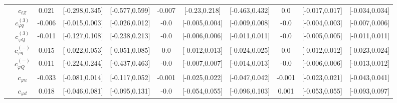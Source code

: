\documentclass{article}
\begin{document}
\begin{table}[H]
\begin{tabular}{|c|c|c|c|c|c|c|c|c|c|c|}
 & $c_{tZ}$ & 0.021                             & [-0.298,0.345]                                 & [-0.577,0.599] & -0.007                             & [-0.23,0.218]                                 & [-0.463,0.432] & 0.0                             & [-0.017,0.017]                                 & [-0.034,0.034] \\ \cline{2-11}
 & $c_{\varphi q}^{(3)}$ & -0.006                             & [-0.015,0.003]                                 & [-0.026,0.012] & -0.0                             & [-0.005,0.004]                                 & [-0.009,0.008] & -0.0                             & [-0.004,0.003]                                 & [-0.007,0.006] \\ \cline{2-11}
 & $c_{\varphi Q}^{(3)}$ & -0.011                             & [-0.127,0.108]                                 & [-0.238,0.213] & -0.0                             & [-0.006,0.006]                                 & [-0.011,0.011] & -0.0                             & [-0.005,0.005]                                 & [-0.011,0.011] \\ \cline{2-11}
 & $c_{\varphi q}^{(-)}$ & 0.015                             & [-0.022,0.053]                                 & [-0.051,0.085] & 0.0                             & [-0.012,0.013]                                 & [-0.024,0.025] & 0.0                             & [-0.012,0.012]                                 & [-0.023,0.024] \\ \cline{2-11}
 & $c_{\varphi Q}^{(-)}$ & 0.011                             & [-0.224,0.244]                                 & [-0.437,0.463] & -0.0                             & [-0.007,0.007]                                 & [-0.014,0.013] & -0.0                             & [-0.006,0.006]                                 & [-0.013,0.012] \\ \cline{2-11}
 & $c_{\varphi u}$ & -0.033                             & [-0.081,0.014]                                 & [-0.117,0.052] & -0.001                             & [-0.025,0.022]                                 & [-0.047,0.042] & -0.001                             & [-0.023,0.021]                                 & [-0.043,0.041] \\ \cline{2-11}
 & $c_{\varphi d}$ & 0.018                             & [-0.046,0.081]                                 & [-0.095,0.131] & -0.0                             & [-0.054,0.055]                                 & [-0.096,0.103] & 0.001                             & [-0.053,0.055]                                 & [-0.093,0.097] \\ \cline{2-11}

\end{tabular}
\end{table}
\end{document}
